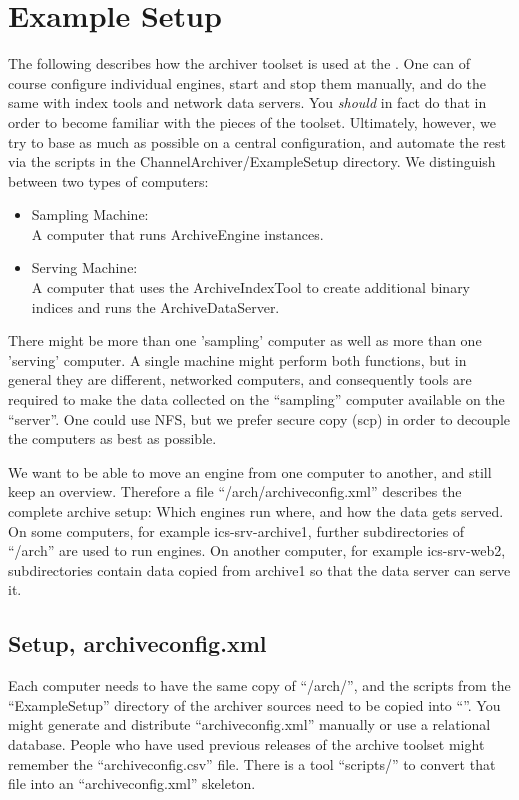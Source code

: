 \chapter{Example Setup} \label{ch:examplesetup}
The following describes how the archiver toolset is used at the
. One can of course configure
individual engines, start and stop them manually, and do the same with
index tools and network data servers. You \emph{should} in fact do
that in order to become familiar with the pieces of the toolset.
Ultimately, however, we try to base as much as possible on a central
configuration, and automate the rest via the scripts in the
ChannelArchiver/ExampleSetup directory.
We distinguish between two types of computers:
\begin{itemize}
\item Sampling Machine:\\
      A computer that runs ArchiveEngine instances.
\item Serving Machine:\\
      A computer that uses the ArchiveIndexTool to create
      additional binary indices and runs the ArchiveDataServer.
\end{itemize}

\noindent There might be more than one 'sampling' computer as well as more
than one 'serving' computer.  A single machine might perform both
functions, but in general they are different, networked computers, and
consequently tools are required to make the data collected on the
``sampling'' computer available on the ``server''.  One could use NFS,
but we prefer secure copy (scp) in order to decouple the computers as
best as possible.

We want to be able to move an engine from one computer to another, and
still keep an overview.  Therefore a file ``/arch/archiveconfig.xml''
describes the complete archive setup: Which engines run where, and how
the data gets served.  On some computers, for example
ics-srv-archive1, further subdirectories of ``/arch'' are used to run
engines.  On another computer, for example ics-srv-web2,
subdirectories contain data copied from archive1 so that the data
server can serve it.

\section{Setup, archiveconfig.xml}
Each computer needs to have the same copy of ``/arch/'',
and the scripts from the ``ExampleSetup'' directory of the archiver
sources need to be copied into ``''.
You might generate and distribute ``archiveconfig.xml'' manually or use a
relational database.  People who have used previous releases of the
archive toolset might remember the ``archiveconfig.csv'' file. There is a
tool ``scripts/'' to convert that
file into an ``archiveconfig.xml'' skeleton.

